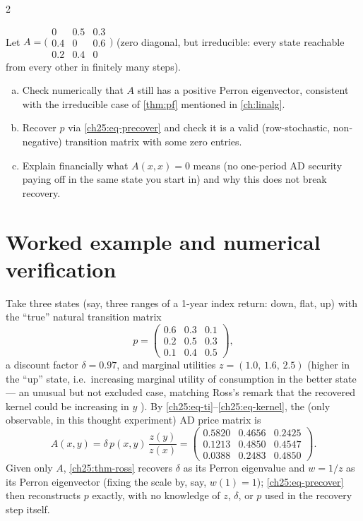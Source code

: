 \begin{paracol}{2}
\begin{exercise}\label{ch25:ex-x-irreducible}
Let $A=\bigl(\begin{smallmatrix}0&0.5&0.3\\0.4&0&0.6\\0.2&0.4&0\end{smallmatrix}\bigr)$ (zero diagonal, but
irreducible: every state reachable from every other in finitely many steps).
\begin{enumerate}[(a)]
  \item Check numerically that $A$
      still has a positive Perron eigenvector, consistent with the irreducible case of \cref{thm:pf} mentioned in
      \cref{ch:linalg}.
  \item Recover $p$ via \eqref{ch25:eq-precover} and check it is a valid (row-stochastic,
      non-negative) transition matrix with some zero entries.
  \item Explain financially what $A(x,x)=0$ means (no
      one-period AD security paying off in the same state you start in) and why this does not break recovery.
\end{enumerate}
\end{exercise}

\section{Worked example and numerical verification}\label{ch25:sec-example}

\begin{example}\label{ch25:ex-3state}
Take three states (say, three ranges of a 1-year index return: down, flat, up) with the ``true'' natural
transition matrix
\[
  p = \begin{pmatrix} 0.6 & 0.3 & 0.1 \\ 0.2 & 0.5 & 0.3 \\ 0.1 & 0.4 & 0.5 \end{pmatrix},
\]
a discount factor $\delta=0.97$, and marginal utilities $z=(1.0,\,1.6,\,2.5)$ (higher in the ``up'' state,
i.e.\ increasing marginal utility of consumption in the better state --- an unusual but not excluded case,
matching Ross's remark that the recovered kernel could be increasing in $y$ ). By
\eqref{ch25:eq-ti}--\eqref{ch25:eq-kernel}, the (only observable, in this thought experiment) AD price
matrix is
\[
  A(x,y) = \delta\, p(x,y)\, \frac{z(y)}{z(x)}
  = \begin{pmatrix} 0.5820 & 0.4656 & 0.2425 \\ 0.1213 & 0.4850 & 0.4547 \\ 0.0388 & 0.2483 & 0.4850 \end{pmatrix}.
\]
Given only $A$, \cref{ch25:thm-ross} recovers $\delta$ as its Perron eigenvalue and $w=1/z$ as its Perron
eigenvector (fixing the scale by, say, $w(1)=1$); \eqref{ch25:eq-precover} then reconstructs $p$ exactly,
with no knowledge of $z$, $\delta$, or $p$ used in the recovery step itself.
\end{example}


\end{paracol}
